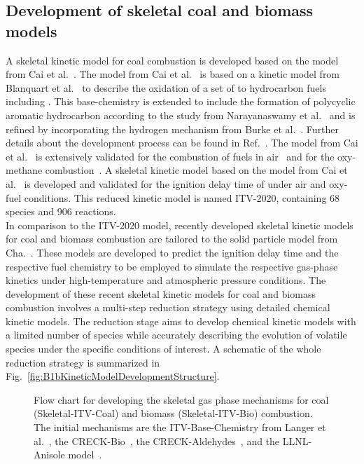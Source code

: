 \begin{refsection}
\subsection{Development of skeletal coal and biomass models}
A skeletal kinetic model for coal combustion is developed based on the model from Cai et al.~\cite{Cai2020}. The model from Cai et al.~\cite{Cai2020} is based on a kinetic model from Blanquart et al.~\cite{Blanquart2009} to describe the oxidation of a set of  to  hydrocarbon fuels including . This base-chemistry is extended to include the formation of polycyclic aromatic hydrocarbon according to the study from Narayanaswamy et al.~\cite{Narayanaswamy2010} and is refined by incorporating the hydrogen mechanism from Burke et al.~\cite{Burke2012}. Further details about the development process can be found in Ref.~\cite{Cai2020}. The model from Cai et al.~\cite{Cai2020} is extensively validated for the combustion of fuels in air~\cite{Cai2019} and for the oxy-methane combustion~\cite{Cai2020}. A skeletal kinetic model based on the model from Cai et al.~\cite{Cai2020} is developed and validated for the ignition delay time of  under air and oxy-fuel conditions. This reduced kinetic model is named ITV-2020, containing 68 species and 906 reactions.
\\
In comparison to the ITV-2020 model, recently developed skeletal kinetic models for coal and biomass combustion are tailored to the solid particle model from Cha.~. These models are developed to predict the ignition delay time and the respective fuel chemistry to be employed to simulate the respective gas-phase kinetics under high-temperature and atmospheric pressure conditions. The development of these recent skeletal kinetic models for coal and biomass combustion involves a multi-step reduction strategy using detailed chemical kinetic models. The reduction stage aims to develop chemical kinetic models with a limited number of species while accurately describing the evolution of volatile species under the specific conditions of interest. A schematic of the whole reduction strategy is summarized in Fig.~\ref{fig:B1bKineticModelDevelopmentStructure}.
\begin{figure}[h]
  \centering
  \caption{Flow chart for developing the skeletal gas phase mechanisms for coal (Skeletal-ITV-Coal) and biomass (Skeletal-ITV-Bio) combustion. The initial mechanisms are the ITV-Base-Chemistry from Langer et al.~\cite{Langer2023}, the CRECK-Bio~\cite{Debiagi2016}, the CRECK-Aldehydes~\cite{Pelucchi2015}, and the LLNL-Anisole model~\cite{Wagnon2018}.}

\end{figure}
\end{refsection}
